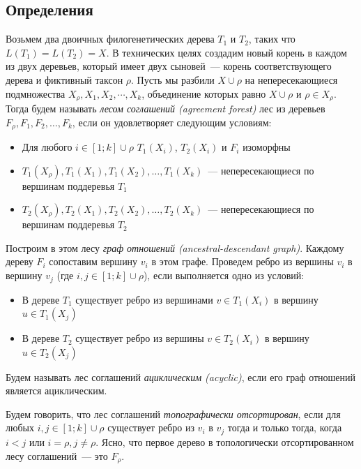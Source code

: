 \documentclass[14pt]{matmex-diploma-custom}
\begin{document}
    \subsection{Определения}
        Возьмем два двоичных филогенетических дерева $T_1$ и $T_2$, таких что $L(T_1)=L(T_2)=X$. В технических целях
        создадим новый корень в каждом из двух деревьев, который имеет двух сыновей~--- корень соответствующего дерева и фиктивный таксон $\rho$. Пусть мы разбили
        $X \cup {\rho}$ на непересекающиеся подмножества $X_\rho, X_1, X_2, \cdots, X_k$, объединение которых равно $X \cup {\rho}$ и $\rho \in X_\rho$. Тогда будем называть
        \textit{лесом соглашений (agreement forest)}  лес из деревьев $F_\rho, F_1, F_2, \ldots, F_k$,
        если он удовлетворяет следующим условиям:
        \begin{itemize}
            \item Для любого $i \in [1; k] \cup \rho$ $T_1(X_i)$, $T_2(X_i)$ и $F_i$ изоморфны
            \item $T_1(X_\rho), T_1(X_1), T_1(X_2), \ldots, T_1(X_k)$~--- непересекающиеся по вершинам поддеревья $T_1$
            \item $T_2(X_\rho), T_2(X_1), T_2(X_2), \ldots, T_2(X_k)$~--- непересекающиеся по вершинам
                поддеревья $T_2$ 
        \end{itemize}
        Построим в этом лесу \textit{граф отношений (ancestral-descendant graph)}. Каждому дереву $F_i$ сопоставим вершину $v_i$ в этом графе. Проведем ребро из вершины $v_i$ в вершину $v_j$ (где $i, j \in [1;k] \cup \rho$), если выполняется одно из условий:
        \begin{itemize}
            \item В дереве $T_1$ существует ребро из вершинами $v \in T_1(X_i)$ в вершину $u \in T_1(X_j)$
            \item В дереве $T_2$ существует ребро из вершины $v \in T_2(X_i)$ в вершину $u \in T_2(X_j)$
        \end{itemize}
        
        Будем называть лес соглашений \textit{ациклическим (acyclic)}, если его граф отношений является ациклическим.
        
        Будем говорить, что лес соглашений \textit{топографически отсортирован}, если для любых $i, j \in [1;k] \cup \rho$ существует ребро из $v_i$ в $v_j$ тогда и только тогда, когда $i < j$ или $i = \rho, j \neq \rho$. Ясно, что первое дерево в топологически отсортированном лесу соглашений~--- это $F_\rho$.
        
\end{document}
